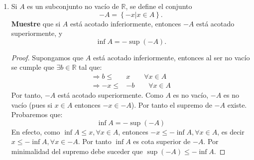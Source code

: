 \documentclass[12pt]{article}
\begin{document}
\begin{enumerate}
    \item Si $A$ es un subconjunto no vacío de $\mathbb{R}$, se define el conjunto
    \begin{equation*}
        -A=\left\{ -x|x\in A \right\}.
    \end{equation*}
    \textbf{Muestre} que si $A$ está acotado inferiormente, entonces $-A$ está acotado superiormente, y
    \begin{equation*}
        \inf A = -\sup \left(-A\right).
    \end{equation*}
    \begin{proof}
        Supongamos que $A$ está acotado inferiormente, entonces al ser no vacío se cumple que $\exists b\in\mathbb{R}$ tal que:
        \begin{equation*}
            \begin{split}
                \Rightarrow b\leq& x\qquad \forall x\in A\\
                \Rightarrow -x\leq& -b\qquad \forall x\in A
            \end{split}
        \end{equation*}
        Por tanto, $-A$ está acotado superiormente. Como $A$ es no vacío, $-A$ es no vacío (pues si $x\in A$  entonces $-x\in -A$). Por tanto el supremo de $-A$ existe. Probaremos que:
        \begin{equation*}
            \inf A = -\sup (-A)
        \end{equation*}
        En efecto, como $\inf A \leq x, \forall x\in A$, entonces $-x\leq -\inf A, \forall x\in A$, es decir $x\leq -\inf A, \forall x\in -A$. Por tanto $\inf A$ es cota superior de $-A$. Por minimalidad del supremo debe suceder que $\sup (-A) \leq -\inf A$.
        

\end{proof}
\end{enumerate}
\end{document}
